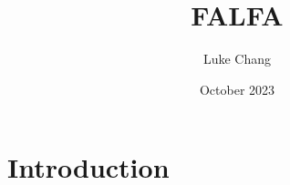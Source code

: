 \documentclass{article}
\title{FALFA}
\author{Luke Chang}
\date{October 2023}
\begin{document}
\maketitle

\section{Introduction}
\end{document}
